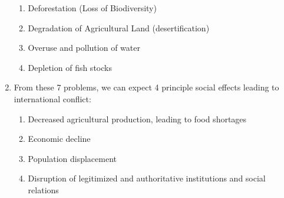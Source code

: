 \documentclass[12pt]{article}
\begin{document}
\begin{enumerate}
\begin{enumerate}
          \item Deforestation (Loss of Biodiversity)

          \item Degradation of Agricultural Land (desertification)

          \item Overuse and pollution of water

          \item Depletion of fish stocks 

        \end{enumerate}

      \item From these 7 problems, we can expect 4 principle social effects leading to international conflict:

        \begin{enumerate}

          \item Decreased agricultural production, leading to food shortages

          \item Economic decline

          \item Population displacement

          \item Disruption of legitimized and authoritative institutions and social relations

        \end{enumerate}

    \end{enumerate}
\end{document}
